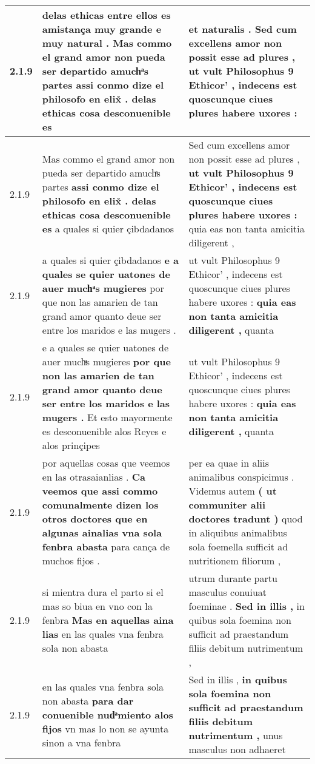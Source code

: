\begin{tabular}{|p{1cm}|p{6.5cm}|p{6.5cm}|}
2.1.9 & delas ethicas entre ellos es amistança muy grande e muy natural . \textbf{ Mas commo el grand amor non pueda ser departido amuchͣs partes } assi conmo dize el philosofo en elix̊ . delas ethicas cosa desconuenible es & et naturalis . \textbf{ Sed cum excellens amor non possit esse ad plures , } ut vult Philosophus 9 Ethicor’ , indecens est quoscunque ciues plures habere uxores : \\\hline
2.1.9 & Mas commo el grand amor non pueda ser departido amuchͣs partes \textbf{ assi conmo dize el philosofo en elix̊ . delas ethicas cosa desconuenible es } a quales si quier çibdadanos & Sed cum excellens amor non possit esse ad plures , \textbf{ ut vult Philosophus 9 Ethicor’ , indecens est quoscunque ciues plures habere uxores : } quia eas non tanta amicitia diligerent , \\\hline
2.1.9 & a quales si quier çibdadanos \textbf{ e a quales se quier uatones de auer muchͣs mugieres } por que non las amarien de tan grand amor quanto deue ser entre los maridos e las mugers . & ut vult Philosophus 9 Ethicor’ , indecens est quoscunque ciues plures habere uxores : \textbf{ quia eas non tanta amicitia diligerent , } quanta \\\hline
2.1.9 & e a quales se quier uatones de auer muchͣs mugieres \textbf{ por que non las amarien de tan grand amor quanto deue ser entre los maridos e las mugers . } Et esto mayormente es desconuenible alos Reyes e alos prinçipes & ut vult Philosophus 9 Ethicor’ , indecens est quoscunque ciues plures habere uxores : \textbf{ quia eas non tanta amicitia diligerent , } quanta \\\hline
2.1.9 & por aquellas cosas que veemos en las otrasaianlias . \textbf{ Ca veemos que assi commo comunalmente dizen los otros doctores que en algunas ainalias vna sola fenbra abasta } para cança de muchos fijos . & per ea quae in aliis animalibus conspicimus . Videmus autem \textbf{ ( ut communiter alii doctores tradunt ) } quod in aliquibus animalibus sola foemella sufficit ad nutritionem filiorum , \\\hline
2.1.9 & si mientra dura el parto si el mas so biua en vno con la fenbra \textbf{ Mas en aquellas aina lias } en las quales vna fenbra sola non abasta & utrum durante partu masculus conuiuat foeminae . \textbf{ Sed in illis , } in quibus sola foemina non sufficit ad praestandum filiis debitum nutrimentum , \\\hline
2.1.9 & en las quales vna fenbra sola non abasta \textbf{ para dar conuenible nudͣmiento alos fijos } vn mas lo non se ayunta sinon a vna fenbra & Sed in illis , \textbf{ in quibus sola foemina non sufficit ad praestandum filiis debitum nutrimentum , } unus masculus non adhaeret \\\hline

\end{tabular}
